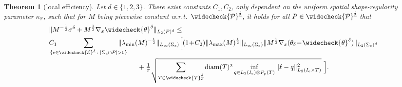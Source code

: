 \documentclass{amsart}
\newtheorem{theorem}{Theorem}[section]
\numberwithin{equation}{section}
\newcommand{\cE}{\mathcal E}
\DeclareMathOperator{\diam}{diam}
\newcommand{\1}{\mathbb 1}
\newcommand{\bbP}{\mathbb{P}}
\newcommand{\tria}{{\mathcal T}}
\newcommand{\pria}{{\mathcal P}}
\begin{document}
\begin{theorem}[local efficiency] \label{thm:efficiency}
Let $d \in \{1,2,3\}$.
There exist constants $C_1, C_2$, only dependent on the uniform spatial shape-regularity parameter $\kappa_\bbP$, such that
for $M$ being piecewise constant w.r.t.~$\widecheck{\pria}^{\underline{\delta}}$, it holds for all $P\in\widecheck\pria^{\underline\delta}$ that
\begin{align*}
& \|M^{-\frac12} \sigma^\delta+M^{\frac12} \nabla_x \widecheck{\theta}^\delta\|_{L_2(P)^d} \leq \\
& C_1 \hspace*{-1.2em}\sum_{\{e \in \widecheck{\cE}^{\underline{\delta}}\colon |\Sigma_e \cap P|>0 \}}\hspace*{-1.5em}
\|\lambda_{\min}(M)^{-\frac12}\|_{L_\infty(\Sigma_e)}  \Big[
(1\!+\!C_2) \|\lambda_{\max}(M)^{\frac12}\|_{L_\infty(\Sigma_e)} \|M^{\frac12} \nabla_x(\theta_\delta\!-\!\widecheck{\theta}^\delta)\|_{L_2(\Sigma_e)^d}\\
 &\hspace*{13em}+
  \tfrac{1}{\pi} \sqrt{ \sum_{T \in \widecheck\tria_e^{\underline{\delta}}} \diam(T)^2\inf_{q \in L_2(I_e)\otimes P_{p}(T)}\|\ell-q\|_{L_2(I_e \times T)} ^2}\,\,
 \Big].
 \end{align*}
\end{theorem}
\end{document}
